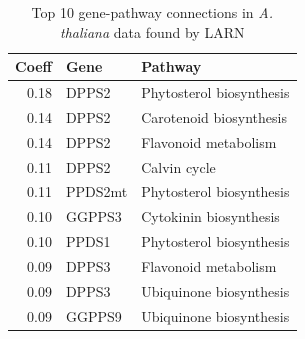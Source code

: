 \begin{table}[htb]
\centering
\begin{small}
\begin{tabular}{rll}
  \hline
Coeff & Gene & Pathway \\ 
  \hline
0.18 & DPPS2 & Phytosterol biosynthesis \\ 
0.14 & DPPS2 & Carotenoid biosynthesis \\ 
0.14 & DPPS2 & Flavonoid metabolism \\ 
0.11 & DPPS2 & Calvin cycle \\ 
0.11 & PPDS2mt & Phytosterol biosynthesis \\ 
0.10 & GGPPS3 & Cytokinin biosynthesis \\ 
0.10 & PPDS1 & Phytosterol biosynthesis \\ 
0.09 & DPPS3 & Flavonoid metabolism \\ 
0.09 & DPPS3 & Ubiquinone biosynthesis \\ 
0.09 & GGPPS9 & Ubiquinone biosynthesis \\ 
\hline
\end{tabular}
\end{small}
\caption{Top 10 gene-pathway connections in {\it A. thaliana} data found by LARN}
\label{table:coefftable}
\end{table}
\vspace{5em}